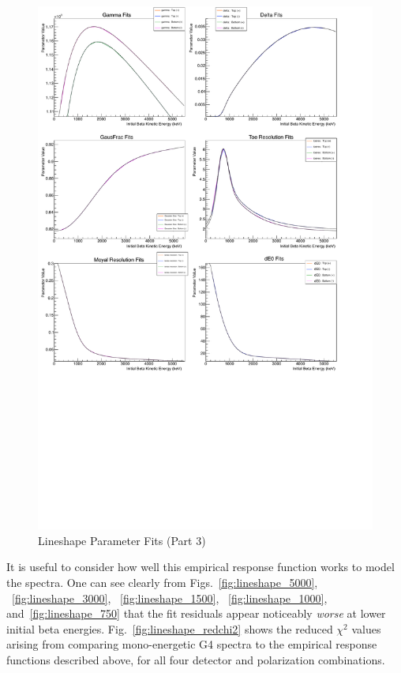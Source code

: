 \begin{figure}[h!!tb]
	\centering
	\includegraphics[width=.999\linewidth]
	{Figures/LineshapeParams_Set3.pdf}
	\caption[Lineshape Parameter Fits (Part 3)]{Lineshape Parameter Fits (Part 3)}	
	\label{fig:lineshapeparams_part3}
\end{figure}
%
It is useful to consider how well this empirical response function works to model the spectra.  One can see clearly from Figs.~\ref{fig:lineshape_5000}, ~\ref{fig:lineshape_3000}, ~\ref{fig:lineshape_1500}, ~\ref{fig:lineshape_1000}, and~\ref{fig:lineshape_750} that the fit residuals appear noticeably \emph{worse} at lower initial beta energies.  Fig.~\ref{fig:lineshape_redchi2} shows the reduced $\chi^2$ values arising from comparing mono-energetic G4 spectra to the empirical response functions described above, for all four detector and polarization combinations.

